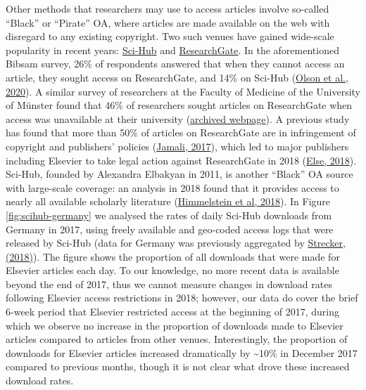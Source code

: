\documentclass[
]{article}
\begin{document}
Other methods that researchers may use to access articles involve so-called ``Black'' or ``Pirate'' OA, where articles are made available on the web with disregard to any existing copyright. Two such venues have gained wide-scale popularity in recent years: \href{https://sci-hub.se/}{Sci-Hub} and \href{https://www.researchgate.net/}{ResearchGate}. In the aforementioned Bibsam survey, 26\% of respondents answered that when they cannot access an article, they sought access on ResearchGate, and 14\% on Sci-Hub (\href{http://doi.org/10.1629/uksg.507}{Olson et al., 2020}). A similar survey of researchers at the Faculty of Medicine of the University of Münster found that 46\% of researchers sought articles on ResearchGate when access was unavailable at their university (\href{https://web.archive.org/web/20210429130228/https://www.uni-muenster.de/ZBMed/aktuelles/27987}{archived webpage}). A previous study has found that more than 50\% of articles on ResearchGate are in infringement of copyright and publishers' policies (\href{https://doi.org/10.1007/s11192-017-2291-4}{Jamali, 2017}), which led to major publishers including Elsevier to take legal action against ResearchGate in 2018 (\href{https://doi.org/10.1038/d41586-018-06945-6}{Else, 2018}). Sci-Hub, founded by Alexandra Elbakyan in 2011, is another ``Black'' OA source with large-scale coverage: an analysis in 2018 found that it provides access to nearly all available scholarly literature (\href{https://doi.org/10.7554/eLife.32822}{Himmelstein et al, 2018}). In Figure \ref{fig:scihub-germany} we analysed the rates of daily Sci-Hub downloads from Germany in 2017, using freely available and geo-coded access logs that were released by Sci-Hub (data for Germany was previously aggregated by \href{http://doi.org/10.5281/zenodo.1286284}{Strecker, (2018)}). The figure shows the proportion of all downloads that were made for Elsevier articles each day. To our knowledge, no more recent data is available beyond the end of 2017, thus we cannot measure changes in download rates following Elsevier access restrictions in 2018; however, our data do cover the brief 6-week period that Elsevier restricted access at the beginning of 2017, during which we observe no increase in the proportion of downloads made to Elsevier articles compared to articles from other venues. Interestingly, the proportion of downloads for Elsevier articles increased dramatically by \textasciitilde10\% in December 2017 compared to previous months, though it is not clear what drove these increased download rates.
\end{document}
